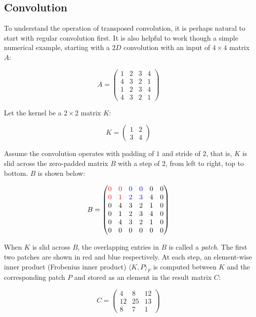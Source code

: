 \subsection{Convolution}

To understand the operation of transposed convolution, it is perhaps natural to start with regular convolution
first. It is also helpful to work though a simple numerical example, starting with a $2D$ convolution
with an input of $4 \times 4$ matrix $A$:

$$
A =
  \begin{pmatrix}
    1 & 2 & 3 & 4 \\
    4 & 3 & 2 & 1 \\
    1 & 2 & 3 & 4 \\
    4 & 3 & 2 & 1
  \end{pmatrix}
$$

Let the kernel be a $2 \times 2$ matrix $K$:

$$
K =
  \begin{pmatrix}
    1 & 2 \\
    3 & 4
  \end{pmatrix}
$$

Assume the convolution operates with padding of $1$ and stride of $2$, that is, $K$ is slid across the
zero-padded matrix $B$ with a step of $2$, from left to right, top to bottom. $B$ is shown below:

$$
B =
  \begin{pmatrix}
    {\color{red}0} & {\color{red}0} & {\color{blue}0} & {\color{blue}0} & 0 & 0 \\
    {\color{red}0} & {\color{red}1} & {\color{blue}2} & {\color{blue}3} & 4 & 0 \\
    0 & 4 & 3 & 2 & 1 & 0 \\
    0 & 1 & 2 & 3 & 4 & 0 \\
    0 & 4 & 3 & 2 & 1 & 0 \\
    0 & 0 & 0 & 0 & 0 & 0
  \end{pmatrix}
$$

When $K$ is slid across $B$, the overlapping entries in $B$ is called a \textit{patch}. The first two
patches are shown in red and blue respectively. At each step, an element-wise inner product (Frobenius inner
product) $\langle K,P \rangle_{F}$ is computed between $K$ and the corresponding patch $P$ and stored as
an element in the result matrix $C$:

$$
C =
  \begin{pmatrix}
    4 & 8 & 12 \\
    12 & 25 & 13 \\
    8 & 7 & 1
  \end{pmatrix}
$$

